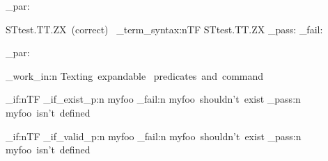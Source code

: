 \documentclass{article}
\begin{document}
\sttests_par:

STtest.TT.ZX~(correct)~
\starray_term_syntax:nTF {STtest.TT.ZX}
  {\sttests_pass:}
  {\sttests_fail:}

\sttests_par:



%

\sttests_work_in:n {Texting~expandable~ predicates~and~command}


\bool_if:nTF {\starray_if_exist_p:n {myfoo}}
  {\sttests_fail:n {myfoo~shouldn't~exist}}
  { \sttests_pass:n {myfoo~isn't~defined}}

\bool_if:nTF {\starray_if_valid_p:n {myfoo}}
  {\sttests_fail:n {myfoo~shouldn't~exist}}
  { \sttests_pass:n {myfoo~isn't~defined}}
\end{document}
